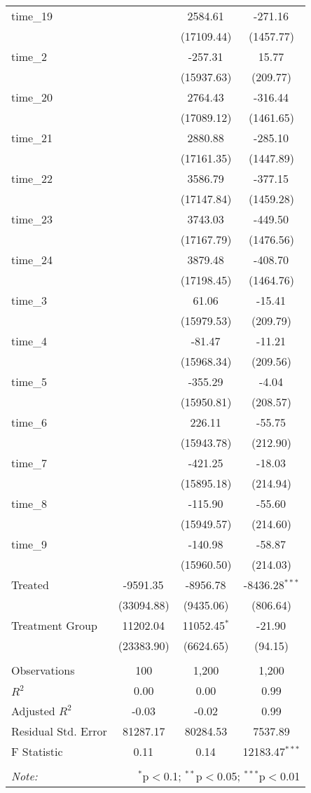 \begin{table}[!htbp]
\begin{tabular}{@{\extracolsep{5pt}}lccc}
 time_19 & & 2584.61$^{}$ & -271.16$^{}$ \\
  & & (17109.44) & (1457.77) \\
 time_2 & & -257.31$^{}$ & 15.77$^{}$ \\
  & & (15937.63) & (209.77) \\
 time_20 & & 2764.43$^{}$ & -316.44$^{}$ \\
  & & (17089.12) & (1461.65) \\
 time_21 & & 2880.88$^{}$ & -285.10$^{}$ \\
  & & (17161.35) & (1447.89) \\
 time_22 & & 3586.79$^{}$ & -377.15$^{}$ \\
  & & (17147.84) & (1459.28) \\
 time_23 & & 3743.03$^{}$ & -449.50$^{}$ \\
  & & (17167.79) & (1476.56) \\
 time_24 & & 3879.48$^{}$ & -408.70$^{}$ \\
  & & (17198.45) & (1464.76) \\
 time_3 & & 61.06$^{}$ & -15.41$^{}$ \\
  & & (15979.53) & (209.79) \\
 time_4 & & -81.47$^{}$ & -11.21$^{}$ \\
  & & (15968.34) & (209.56) \\
 time_5 & & -355.29$^{}$ & -4.04$^{}$ \\
  & & (15950.81) & (208.57) \\
 time_6 & & 226.11$^{}$ & -55.75$^{}$ \\
  & & (15943.78) & (212.90) \\
 time_7 & & -421.25$^{}$ & -18.03$^{}$ \\
  & & (15895.18) & (214.94) \\
 time_8 & & -115.90$^{}$ & -55.60$^{}$ \\
  & & (15949.57) & (214.60) \\
 time_9 & & -140.98$^{}$ & -58.87$^{}$ \\
  & & (15960.50) & (214.03) \\
 Treated & -9591.35$^{}$ & -8956.78$^{}$ & -8436.28$^{***}$ \\
  & (33094.88) & (9435.06) & (806.64) \\
 Treatment Group & 11202.04$^{}$ & 11052.45$^{*}$ & -21.90$^{}$ \\
  & (23383.90) & (6624.65) & (94.15) \\
\hline \\[-1.8ex]
 Observations & 100 & 1,200 & 1,200 \\
 $R^2$ & 0.00 & 0.00 & 0.99 \\
 Adjusted $R^2$ & -0.03 & -0.02 & 0.99 \\
 Residual Std. Error & 81287.17 & 80284.53 & 7537.89  \\
 F Statistic & 0.11$^{}$  & 0.14$^{}$  & 12183.47$^{***}$  \\
\hline
\hline \\[-1.8ex]
\textit{Note:} & \multicolumn{3}{r}{$^{*}$p$<$0.1; $^{**}$p$<$0.05; $^{***}$p$<$0.01} \\
\end{tabular}
\end{table}